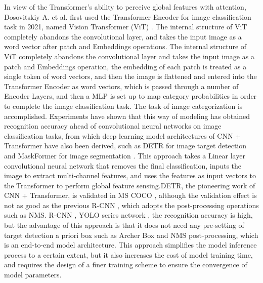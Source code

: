 \documentclass{article}
\begin{document}
In view of the Transformer's ability to perceive global features with attention, Dosovitskiy A. et al. first used the Transformer Encoder for image classification task in 2021, named Vision Transformer (ViT) \cite{14}. The internal structure of ViT completely abandons the convolutional layer, and takes the input image as a word vector after patch and Embeddings operations. The internal structure of ViT completely abandons the convolutional layer and takes the input image as a patch and Embeddings operation, the embedding of each patch is treated as a single token of word vectors, and then the image is flattened and entered into the Transformer Encoder as word vectors, which is passed through a number of Encoder Layers, and then a MLP is set up to map category probabilities in order to complete the image classification task. The task of image categorization is accomplished. Experiments have shown that this way of modeling has obtained recognition accuracy ahead of convolutional neural networks on image classification tasks, from which deep learning model architectures of CNN + Transformer have also been derived, such as DETR for image target detection \cite{15} and MaskFormer for image segmentation \cite{16}. This approach takes a Linear layer convolutional neural network that removes the final classification, inputs the image to extract multi-channel features, and uses the features as input vectors to the Transformer to perform global feature sensing.DETR, the pioneering work of CNN + Transformer, is validated in MS COCO \cite{17}, although the validation effect is not as good as the previous R-CNN \cite{17}, which adopts the post-processing operations such as NMS. R-CNN \cite{18}, YOLO series network \cite{19}, the recognition accuracy is high, but the advantage of this approach is that it does not need any pre-setting of target detection a priori box such as Archer Box and NMS post-processing, which is an end-to-end model architecture. This approach simplifies the model inference process to a certain extent, but it also increases the cost of model training time, and requires the design of a finer training scheme to ensure the convergence of model parameters.
\end{document}
